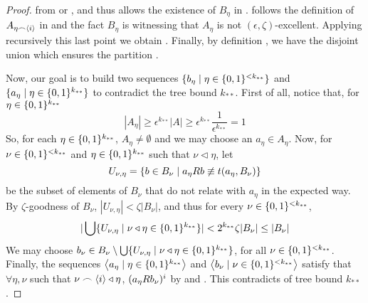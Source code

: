 \begin{lemma}[Claim 5.4]
\begin{proof}
                from  or ,
                and thus allows the existence of $B_\eta$ in .
                 follows the definition of $A_{\eta \frown \left< i \right>}$ in
                 and the fact $B_\eta$ is witnessing that $A_\eta$ is not $(\epsilon, \zeta)$-excellent.
                Applying recursively this last point we obtain .
                Finally, by definition , we have the disjoint union
                 which ensures
                the partition .

                Now, our goal is to build two sequences $\{ b_\eta \mid \eta \in \{ 0,1 \}^{<k_{**}} \}$ and
                $\{ a_\eta \mid \eta \in \{ 0,1 \}^{k_{**}} \}$ to contradict the tree bound $k_{**}$.
                First of all, notice that, for $\eta \in \{ 0,1 \}^{k_{**}}$
                \[
                    |A_\eta| \geq \epsilon^{k_{**}} |A| \geq
                    \epsilon^{k_{**}} \frac{1}{\epsilon^{k_{**}}} = 1
                \]
                So, for each $\eta \in \{ 0,1 \}^{k_{**}}$, $A_\eta \neq \emptyset$ and we may choose an $a_\eta \in A_\eta$.
                Now, for $\nu \in \{ 0,1 \}^{<k_{**}}$ and $\eta \in \{ 0,1 \}^{k_{**}}$ such that $\nu \triangleleft \eta$, let
                \[
                    U_{\nu,\eta} = \{ b \in B_\nu \mid a_\eta R b \not\equiv t(a_\eta, B_\nu) \}
                \]
                be the subset of elements of $B_\nu$ that do not relate with $a_\eta$ in the expected way.
                By $\zeta$-goodness of $B_\nu$, $|U_{\nu, \eta}| < \zeta |B_\nu|$, and thus for every $\nu \in \{ 0,1 \}^{<k_{**}}$,
                \[
                    | \bigcup\{  U_{\nu,\eta} \mid \nu \triangleleft \eta \in \{ 0,1 \}^{k_{**}} \} | <
                    2^{k_{**}} \zeta |B_\nu| \leq |B_\nu|
                \]
                We may choose $b_\nu \in B_\nu \setminus \bigcup\{ U_{\nu,\eta} \mid \nu \triangleleft \eta \in \{ 0,1 \}^{k_{**}} \}$,
                for all $\nu \in \{ 0,1 \}^{<k_{**}}$.
                Finally, the sequences $\left< a_\eta \mid \eta \in \{ 0,1 \}^{k_{**}} \right>$ and $\left< b_\nu \mid \nu \in \{ 0,1 \}^{<k_{**}} \right>$
                satisfy that $\forall \eta, \nu$ such that $\nu \frown \left< i \right> \triangleleft \eta$, $( a_\eta R b_\nu )^i$
                by  and .
                This contradicts  of tree bound $k_{**}$.
            \end{proof}
        \end{lemma}

